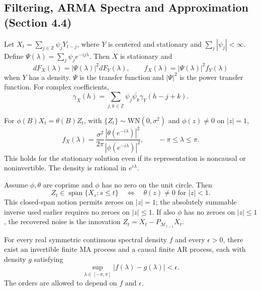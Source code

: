 \subsection{Filtering, ARMA Spectra and Approximation (Section 4.4)}
\begin{theorem}
Let $X_t=\sum_{j\in\mathbb Z}\psi_jY_{t-j}$, where $Y$ is centered and
stationary and $\sum_j|\psi_j|<\infty$. Define
$\Psi(\lambda)=\sum_j\psi_je^{-ij\lambda}$.
Then $X$ is stationary and
\[
dF_X(\lambda)=|\Psi(\lambda)|^2dF_Y(\lambda),\qquad
f_X(\lambda)=|\Psi(\lambda)|^2 f_Y(\lambda)
\]
when $Y$ has a density. $\Psi$ is the transfer function and $|\Psi|^2$ is
the power transfer function. For complex coefficients,
\[
\gamma_X(h)=\sum_{j,k\in\mathbb Z}\psi_j\overline{\psi_k}
\gamma_Y(h-j+k).
\]
\end{theorem}
\begin{theorem}
For $\phi(B)X_t=\theta(B)Z_t$, with
$\{Z_t\}\sim\mathrm{WN}(0,\sigma^2)$ and $\phi(z)\ne0$ on $|z|=1$,
\[
f_X(\lambda)=\frac{\sigma^2}{2\pi}
\frac{|\theta(e^{-i\lambda})|^2}{|\phi(e^{-i\lambda})|^2},
\qquad -\pi\le\lambda\le\pi.
\]
This holds for the stationary solution even if its representation is
noncausal or noninvertible. The density is rational in $e^{i\lambda}$.
\end{theorem}
\begin{proposition}
Assume $\phi,\theta$ are coprime and $\phi$ has no zero on the unit circle.
Then
\[
Z_t\in\overline{\operatorname{span}}\{X_s:s\le t\}
\quad\Longleftrightarrow\quad \theta(z)\ne0\text{ for }|z|<1.
\]
This closed-span notion permits zeroes on $|z|=1$; the absolutely summable
inverse used earlier requires no zeroes on $|z|\le1$.
If also $\phi$ has no zeroes on $|z|\le1$, the recovered noise is the innovation
$Z_t=X_t-P_{\mathcal M_{t-1}}X_t$.
\end{proposition}
\begin{theorem}
For every real symmetric continuous spectral density $f$ and every
$\epsilon>0$, there exist an invertible finite MA process and a causal
finite AR process, each with density $g$ satisfying
\[
\sup_{\lambda\in[-\pi,\pi]}|f(\lambda)-g(\lambda)|<\epsilon.
\]
The orders are allowed to depend on $f$ and $\epsilon$.
\end{theorem}

